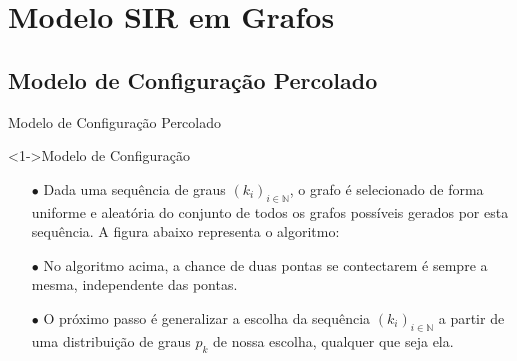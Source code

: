 \documentclass{beamer}
\begin{document}

\section{Modelo SIR em Grafos}
\subsection{Modelo de Configuração Percolado}

\begin{frame}{Modelo de Configuração Percolado}

\begin{exampleblock}
<1->{Modelo de Configuração}

\begin{itemize}
    \item[$\bullet$] Dada uma sequência de graus $(k_i)_{i \in \mathbb{N}}$, o grafo é selecionado de 
        forma uniforme e aleatória do conjunto de todos os grafos possíveis gerados por esta 
        sequência. A figura abaixo representa o algoritmo:

\begin{figure}
    \begin{center}

    
    \end{center}
\end{figure}

\item[$\bullet$] No algoritmo acima, a chance de duas pontas se contectarem é sempre a mesma,
    independente das pontas. 
\item[$\bullet$] O próximo passo é generalizar a escolha da sequência $(k_i)_{i \in \mathbb{N}}$ 
    a partir de uma distribuição de graus $p_k$ de nossa escolha, qualquer que seja ela.

\end{itemize}

\end{exampleblock} 
    
\end{frame}
\end{document}
